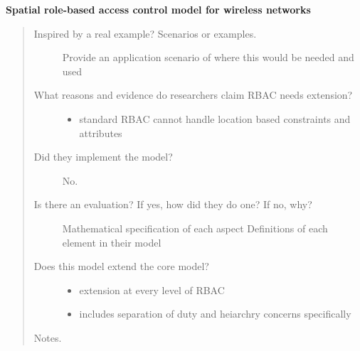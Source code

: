 \documentclass[letterpaper,10pt,english]{sphinxmanual}
\begin{document}
\textbf{Spatial role-based access control model for wireless networks}
\begin{quote}
\begin{description}
\item[{Inspired by a real example? Scenarios or examples.}] \leavevmode
Provide an application scenario of where this would be needed and used

\item[{What reasons and evidence do researchers claim RBAC needs extension?}] \leavevmode\begin{itemize}
\item {} 
standard RBAC cannot handle location based constraints and attributes

\end{itemize}

\item[{Did they implement the model?}] \leavevmode
No.

\item[{Is there an evaluation? If yes, how did they do one? If no, why?}] \leavevmode
Mathematical specification of each aspect
Definitions of each element in their model

\item[{Does this model extend the core model?}] \leavevmode\begin{itemize}
\item {} 
extension at every level of RBAC

\item {} 
includes separation of duty and heiarchry concerns specifically

\end{itemize}

\end{description}

Notes.
\end{quote}
\end{document}
